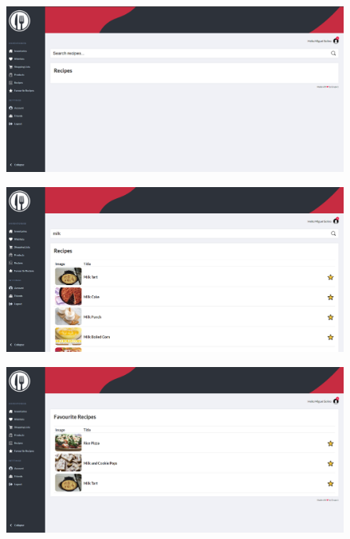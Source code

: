 \documentclass[a4paper]{report}
\begin{document}
    \begin{figure}[H]
        \centering
            \includegraphics[width=\textwidth]{images/produto_final/procura_de_receitas.png}
    \end{figure}

    \begin{figure}[H]
        \centering
            \includegraphics[width=\textwidth]{images/produto_final/procura_de_receitas_efetuadas.png}
    \end{figure}

    \begin{figure}[H]
        \centering
            \includegraphics[width=\textwidth]{images/produto_final/receitas_favoritas.png}
    \end{figure}
\end{document}
